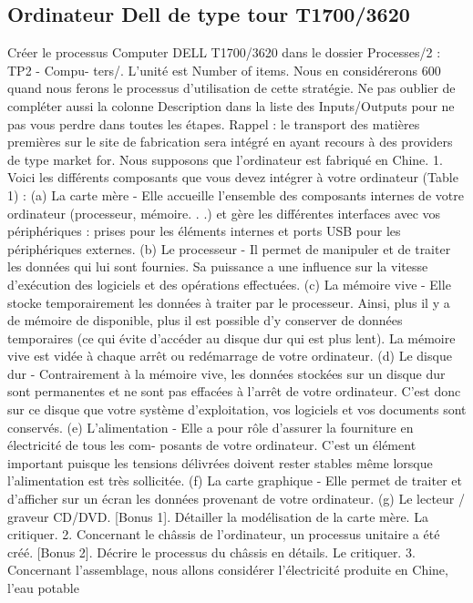 \documentclass[12pt,a4paper]{article}
\begin{document}
\subsection{Ordinateur Dell de type tour T1700/3620}
Créer le processus Computer DELL T1700/3620 dans le dossier Processes/2 : TP2 - Compu-
ters/. L’unité est Number of items. Nous en considérerons 600 quand nous ferons le processus
d’utilisation de cette stratégie. Ne pas oublier de compléter aussi la colonne Description dans la
liste des Inputs/Outputs pour ne pas vous perdre dans toutes les étapes. Rappel : le transport
des matières premières sur le site de fabrication sera intégré en ayant recours à des providers de
type market for. Nous supposons que l’ordinateur est fabriqué en Chine.
1. Voici les différents composants que vous devez intégrer à votre ordinateur (Table 1) :
(a) La carte mère - Elle accueille l’ensemble des composants internes de votre ordinateur
(processeur, mémoire. . .) et gère les différentes interfaces avec vos périphériques : prises
pour les éléments internes et ports USB pour les périphériques externes.
(b) Le processeur - Il permet de manipuler et de traiter les données qui lui sont fournies.
Sa puissance a une influence sur la vitesse d’exécution des logiciels et des opérations
effectuées.
(c) La mémoire vive - Elle stocke temporairement les données à traiter par le processeur.
Ainsi, plus il y a de mémoire de disponible, plus il est possible d’y conserver de données
temporaires (ce qui évite d’accéder au disque dur qui est plus lent). La mémoire vive est
vidée à chaque arrêt ou redémarrage de votre ordinateur.
(d) Le disque dur - Contrairement à la mémoire vive, les données stockées sur un disque dur
sont permanentes et ne sont pas effacées à l’arrêt de votre ordinateur. C’est donc sur ce
disque que votre système d’exploitation, vos logiciels et vos documents sont conservés.
(e) L’alimentation - Elle a pour rôle d’assurer la fourniture en électricité de tous les com-
posants de votre ordinateur. C’est un élément important puisque les tensions délivrées
doivent rester stables même lorsque l’alimentation est très sollicitée.
(f) La carte graphique - Elle permet de traiter et d’afficher sur un écran les données provenant
de votre ordinateur.
(g) Le lecteur / graveur CD/DVD.
[Bonus 1]. Détailler la modélisation de la carte mère. La critiquer.
2. Concernant le châssis de l’ordinateur, un processus unitaire a été créé.
[Bonus 2]. Décrire le processus du châssis en détails. Le critiquer.
3. Concernant l’assemblage, nous allons considérer l’électricité produite en Chine, l’eau potable
\end{document}
